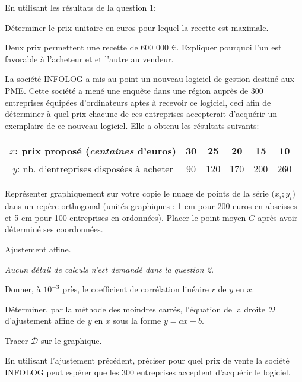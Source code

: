 \documentclass[a4paper,12pt]{scrartcl}
\begin{document}
En utilisant les résultats de la question 1:

\subquestion{}
Déterminer le prix unitaire en euros pour lequel la recette est maximale. %

\subquestion{}
Deux prix permettent une recette de 600 000 €. Expliquer pourquoi l'un est favorable à l'acheteur et et l'autre au vendeur.


La société INFOLOG a mis au point un nouveau logiciel de gestion destiné aux PME. Cette société a mené une enquête dans une région auprès de 300 entreprises équipées d'ordinateurs aptes à recevoir ce logiciel, ceci afin de déterminer à quel prix chacune de ces entreprises accepterait d'acquérir un exemplaire de ce nouveau logiciel. Elle a obtenu les résultats suivants:

\begin{center}
\begin{tabular}{|c|c|c|c|c|c|}
\hline 
$x$: prix proposé (\emph{centaines} d'euros) & 30 & 25 & 20 & 15 & 10 \\
\hline 
$y$: nb. d'entreprises disposées à acheter & 90 & 120 & 170 & 200 & 260\\
\hline 
\end{tabular} 
\end{center}

\question{}
Représenter graphiquement sur votre copie le nuage de points de la série $(x_i ; y_i$) dans un repère orthogonal (unités graphiques : 1 cm pour 200 euros en abscisses et 5 cm pour 100 entreprises en ordonnées). Placer le point moyen $G$ après avoir déterminé ses coordonnées. %

\question{}
Ajustement affine.

\emph{Aucun détail de calculs n'est demandé dans la question 2.}

\subquestion{}
Donner, à $10^{-3}$ près, le coefficient de corrélation linéaire $r$ de $y$ en $x$.

\subquestion{}
Déterminer, par la méthode des moindres carrés, l'équation de la droite $\mathcal{D}$ d'ajustement affine de $y$ en $x$ sous la forme $y = ax + b$.


Tracer $\mathcal{D}$ sur le graphique.

\question{}
En utilisant l'ajustement précédent, préciser pour quel prix de vente la société INFOLOG peut espérer que les 300 entreprises acceptent d'acquérir le logiciel.

\appendix
\end{document}
